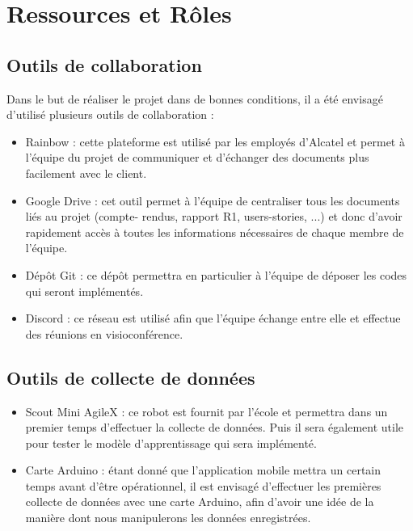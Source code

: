 \section{Ressources et Rôles}
\subsection{Outils de collaboration}
Dans le but de réaliser le projet dans de bonnes conditions, il a été envisagé
d'utilisé plusieurs outils de
collaboration :
\begin{itemize}
    \item Rainbow : cette plateforme est utilisé par les employés d'Alcatel et
    permet à l'équipe du projet de
    communiquer et d'échanger des documents plus facilement avec le client.
    \item Google Drive : cet outil permet à l'équipe de centraliser tous les
    documents liés au projet (compte-
    rendus, rapport R1, users-stories, ...) et donc d'avoir rapidement accès à
    toutes les informations
    nécessaires de chaque membre de l'équipe.
    \item Dépôt Git : ce dépôt permettra en particulier à l'équipe de déposer
    les
    codes qui seront
    implémentés.
    \item Discord : ce réseau est utilisé afin que l'équipe échange entre elle
    et
    effectue des réunions en
    visioconférence.
\end{itemize}
\subsection{Outils de collecte de données}
\begin{itemize}
    \item Scout Mini AgileX : ce robot est fournit par l'école et permettra
    dans un
    premier temps d'effectuer
    la collecte de données. Puis il sera également utile pour tester le modèle
    d'apprentissage qui sera
    implémenté.
    \item Carte Arduino : étant donné que l'application mobile mettra un
    certain
    temps avant d'être
    opérationnel, il est envisagé d'effectuer les premières collecte de données
    avec une carte Arduino,
    afin d'avoir une idée de la manière dont nous manipulerons les données
    enregistrées.
\end{itemize}